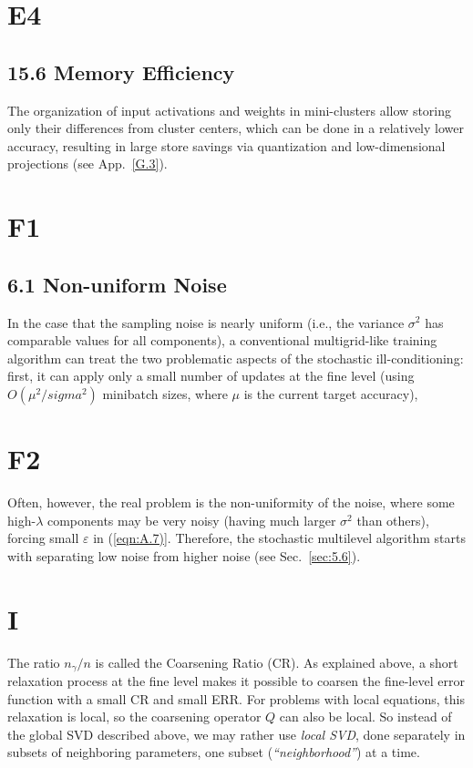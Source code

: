 \documentclass{article} %
\begin{document}
\section{E4}
\subsection{15.6 Memory Efficiency}
The organization of input activations and weights in mini-clusters allow storing only their differences from cluster centers, which can be done in a relatively lower accuracy, resulting in large store savings via quantization and low-dimensional projections (see App.~\ref{G.3}).

\section{F1}
\subsection{6.1 Non-uniform Noise}
In the case that the sampling noise is nearly uniform (i.e., the variance $\sigma^2$ has comparable values for all components), a conventional multigrid-like training algorithm can treat the two problematic aspects of the stochastic ill-conditioning: first, it can apply only a small number of updates at the fine level (using $O(\mu^2/sigma^2)$ minibatch sizes, where $\mu$ is the current target accuracy),

\section{F2}
Often, however, the real problem is the non-uniformity of the noise, where some high-$\lambda$ components may be very noisy (having much larger $\sigma^2$ than others), forcing small $\varepsilon$ in (\ref{eqn:A.7)}. Therefore, the stochastic multilevel algorithm starts with separating low noise from higher noise (see Sec.~\ref{sec:5.6}).

\section{I}
The ratio $n_{\gamma}/n$ is called the Coarsening Ratio (CR). As explained above, a short relaxation process at the fine level makes it possible to coarsen the fine-level error function with a small CR and small ERR. For problems with local equations, this relaxation is local, so the coarsening operator $Q$ can also be local. So instead of the global SVD described above, we may rather use {\it local SVD}, done separately in subsets of neighboring parameters, one subset ({\it ``neighborhood''}) at a time.
\end{document}
